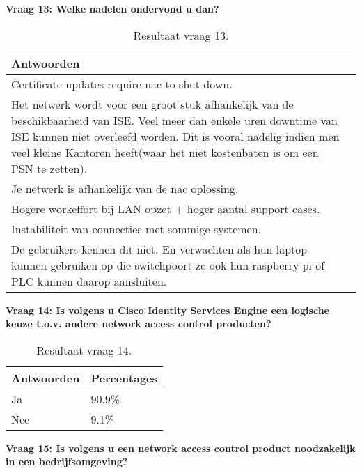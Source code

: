\newpage
\textbf{Vraag 13: Welke nadelen ondervond u dan?}
\begin{table}[H]
	\begin{center}
		\setlength{}
		\noindent\begin{tabular}{p{\q}p{\q}}
			\hline
		\bf Antwoorden \\ \hline
		Certificate updates require nac to shut down. \\ \hline
		Het netwerk wordt voor een groot stuk afhankelijk van de beschikbaarheid van ISE. Veel meer dan enkele uren downtime van ISE kunnen niet overleefd worden. Dit is vooral nadelig indien men veel kleine Kantoren heeft(waar het niet kostenbaten is om een PSN te zetten). \\ \hline
		Je netwerk is afhankelijk van de nac oplossing.  \\ \hline
		Hogere workeffort bij LAN opzet + hoger aantal support cases. \\ \hline
		Instabiliteit van connecties met sommige systemen. \\ \hline
		De gebruikers kennen dit niet. En verwachten als hun laptop kunnen gebruiken op die switchpoort ze ook hun raspberry pi of PLC kunnen daarop aansluiten.       \\ \hline                                                  
		\end{tabular}
		\caption{Resultaat vraag 13.}
	\end{center}
\end{table}

\textbf{Vraag 14: Is volgens u Cisco Identity Services Engine een logische keuze t.o.v. andere network access control producten?} 

\begin{table}[H]
	\begin{center}
		\begin{tabular}{|l|l|}
			\hline
			\bf Antwoorden    & \bf Percentages \\ \hline
			Ja      & 90.9\% \\ \hline
			Nee     & 9.1\%    \\ \hline                                                           
		\end{tabular}
		\caption{Resultaat vraag 14.}
	\end{center}
\end{table}

\textbf{Vraag 15: Is volgens u een network access control product noodzakelijk in een bedrijfsomgeving?}

